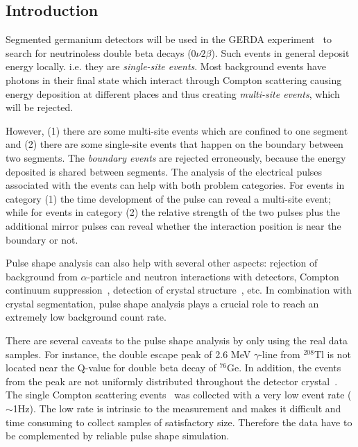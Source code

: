 \subsection{Introduction}
\label{sec:intro}

Segmented germanium detectors will be used in the GERDA experiment~\cite{gerda} to search for neutrinoless double beta decays ($0 \nu 2 \beta$). Such events in general deposit energy locally. i.e. they are \textit{single-site events}. Most background events have photons in their final state which interact through Compton scattering causing energy deposition at different places and thus creating \textit{multi-site events}, which will be rejected.

However, (1) there are some multi-site events which are confined to one segment and (2) there are some single-site events that happen on the boundary between two segments. The \textit{boundary events} are rejected erroneously, because the energy deposited is shared between segments. The analysis of the electrical pulses associated with the events can help with both problem categories. For events in category (1) the time development of the pulse can reveal a multi-site event; while for events in category (2) the relative strength of the two pulses plus the additional mirror pulses can reveal whether the interaction position is near the boundary or not.

Pulse shape analysis can also help with several other aspects: rejection of background from $\alpha$-particle and neutron interactions with detectors, Compton continuum suppression~\cite{comcon}, detection of crystal structure~\cite{agata}, etc. In combination with crystal segmentation, pulse shape analysis plays a crucial role to reach an extremely low background count rate.

There are several caveats to the pulse shape analysis by only using the real data samples. For instance, the double escape peak of 2.6 MeV $\gamma$-line from $^{208}$Tl is not located near the Q-value for double beta decay of $^{76}$Ge. In addition, the events from the peak are not uniformly distributed throughout the detector crystal~\cite{major}. The single Compton scattering events~\cite{xiang} was collected with a very low event rate ($\sim$1Hz). The low rate is intrinsic to the measurement and makes it difficult and time consuming to collect samples of satisfactory size. Therefore the data have to be complemented by reliable pulse shape simulation.

